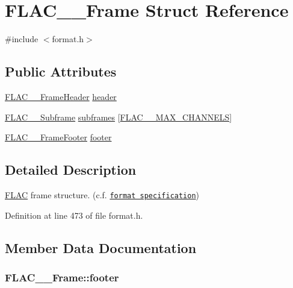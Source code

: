 \hypertarget{struct_f_l_a_c_____frame}{}\section{F\+L\+A\+C\+\_\+\+\_\+\+Frame Struct Reference}
\label{struct_f_l_a_c_____frame}


{\ttfamily \#include $<$format.\+h$>$}

\subsection*{Public Attributes}
\begin{DoxyCompactItemize}
\item 
\hyperlink{struct_f_l_a_c_____frame_header}{F\+L\+A\+C\+\_\+\+\_\+\+Frame\+Header} \hyperlink{struct_f_l_a_c_____frame_ae39796592bb27512110976fe7b80ce06}{header}
\item 
\hyperlink{struct_f_l_a_c_____subframe}{F\+L\+A\+C\+\_\+\+\_\+\+Subframe} \hyperlink{struct_f_l_a_c_____frame_a526e3e6173e7a6db752e7a44bff3e91d}{subframes} \mbox{[}\hyperlink{group__flac__format_ga488aa5678a58d08f984f5d39185b763d}{F\+L\+A\+C\+\_\+\+\_\+\+M\+A\+X\+\_\+\+C\+H\+A\+N\+N\+E\+LS}\mbox{]}
\item 
\hyperlink{struct_f_l_a_c_____frame_footer}{F\+L\+A\+C\+\_\+\+\_\+\+Frame\+Footer} \hyperlink{struct_f_l_a_c_____frame_ae8862dd8210e49bda8179559891d2d4e}{footer}
\end{DoxyCompactItemize}


\subsection{Detailed Description}
\hyperlink{namespace_f_l_a_c}{F\+L\+AC} frame structure. (c.\+f. \href{../format.html#frame}{\tt format specification}) 

Definition at line 473 of file format.\+h.



\subsection{Member Data Documentation}
\subsubsection[{\texorpdfstring{footer}{footer}}]{ F\+L\+A\+C\+\_\+\+\_\+\+Frame\+::footer}\hypertarget{struct_f_l_a_c_____frame_ae8862dd8210e49bda8179559891d2d4e}{}\label{struct_f_l_a_c_____frame_ae8862dd8210e49bda8179559891d2d4e}


